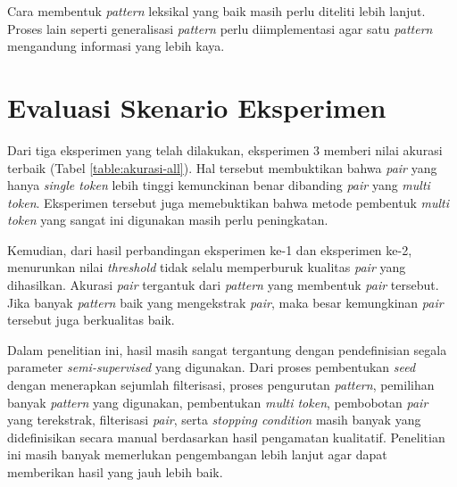 Cara membentuk \textit{pattern} leksikal yang baik masih perlu diteliti lebih lanjut. Proses lain seperti generalisasi \textit{pattern} perlu diimplementasi agar satu \textit{pattern} mengandung informasi yang lebih kaya.

\section{Evaluasi Skenario Eksperimen}
Dari tiga eksperimen yang telah dilakukan, eksperimen 3 memberi nilai akurasi terbaik (Tabel \ref{table:akurasi-all}). Hal tersebut membuktikan bahwa \textit{pair} yang hanya \textit{single token} lebih tinggi kemunckinan benar dibanding \textit{pair} yang \textit{multi token}. Eksperimen tersebut juga memebuktikan bahwa metode pembentuk \textit{multi token} yang sangat ini digunakan masih perlu peningkatan.

Kemudian, dari hasil perbandingan eksperimen ke-1 dan eksperimen ke-2, menurunkan nilai \textit{threshold} tidak selalu memperburuk kualitas \textit{pair} yang dihasilkan. Akurasi \textit{pair} tergantuk dari \textit{pattern} yang membentuk \textit{pair} tersebut. Jika banyak \textit{pattern} baik yang mengekstrak \textit{pair}, maka besar kemungkinan \textit{pair} tersebut juga berkualitas baik.

Dalam penelitian ini, hasil masih sangat tergantung dengan pendefinisian segala parameter \textit{semi-supervised} yang digunakan. Dari proses pembentukan \textit{seed} dengan menerapkan sejumlah filterisasi, proses pengurutan \textit{pattern}, pemilihan banyak \textit{pattern} yang digunakan, pembentukan \textit{multi token}, pembobotan \textit{pair} yang terekstrak, filterisasi \textit{pair}, serta \textit{stopping condition} masih banyak yang didefinisikan secara manual berdasarkan hasil pengamatan kualitatif. Penelitian ini masih banyak memerlukan pengembangan lebih lanjut agar dapat memberikan hasil yang jauh lebih baik. 
